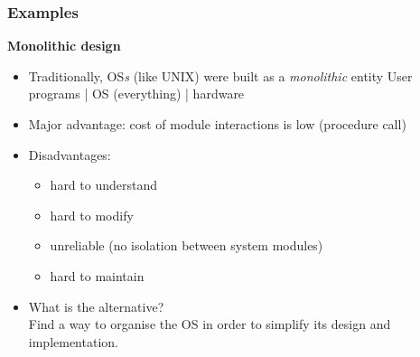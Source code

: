 \documentclass[11pt,a4paper]{article}
\begin{document}
\subsubsection{Examples}

\textbf{Monolithic design}
\begin{itemize}
    \item Traditionally, OS\emph{s} (like UNIX) were built as a \emph{monolithic} entity
        User programs | OS (everything) | hardware
    \item Major advantage: cost of module interactions is low (procedure call)
    \item Disadvantages:
        \begin{itemize}
            \item hard to understand
            \item hard to modify
            \item unreliable (no isolation between system modules)
            \item hard to maintain
        \end{itemize}
    \item What is the alternative? \\
        Find a way to organise the OS in order to simplify its design and implementation.
\end{itemize}
\end{document}

